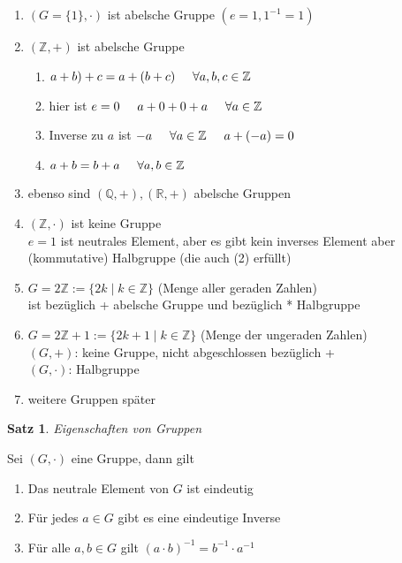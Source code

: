 \documentclass[a4paper,11pt]{article}
\newtheorem{satz}[definition]{Satz}
\begin{document}
\begin{enumerate}[label=\alph*)]
\item $(G=\{1\},\cdot)$ ist abelsche Gruppe $(e=1, 1^{-1}=1)$
\item $(\mathbb{Z}, +)$ ist abelsche Gruppe
\begin{enumerate}[label=(\arabic*)]
\item $a+b)+c=a+(b+c)\hspace{5mm}\forall a,b,c\in\mathbb{Z}$
\item hier ist $e=0\hspace{5mm}a+0+0+a\hspace{5mm}\forall a\in\mathbb{Z}$
\item Inverse zu $a$ ist $-a\hspace{5mm}\forall a\in\mathbb{Z}\hspace{5mm}a+(-a)=0$
\item $a+b=b+a\hspace{5mm}\forall a,b\in\mathbb{Z}$
\end{enumerate}
\item ebenso sind $(\mathbb{Q},+), (\mathbb{R}, +)$ abelsche Gruppen
\item $(\mathbb{Z},\cdot)$ ist keine Gruppe \\
$e=1$ ist neutrales Element, aber es gibt kein inverses Element aber (kommutative) Halbgruppe (die auch (2) erfüllt)
\item $G=2\mathbb{Z}:=\{2k\mid k\in\mathbb{Z}\}$ (Menge aller geraden Zahlen) \\
ist bezüglich + abelsche Gruppe und bezüglich * Halbgruppe
\item $G=2\mathbb{Z}+1:=\{2k+1\mid k\in\mathbb{Z}\}$ (Menge der ungeraden Zahlen) \\
$(G,+)$: keine Gruppe, nicht abgeschlossen bezüglich + \\
$(G,\cdot)$: Halbgruppe
\item weitere Gruppen später
\end{enumerate}
\begin{satz}
Eigenschaften von Gruppen
\end{satz}
Sei $(G,\cdot)$ eine Gruppe, dann gilt
\begin{enumerate}[label=\alph*)]
\item Das neutrale Element von $G$ ist eindeutig 
\item Für jedes $a\in G$ gibt es eine eindeutige Inverse
\item Für alle $a,b\in G$ gilt $(a\cdot b)^{-1}=b^{-1}\cdot a^{-1}$
\end{enumerate}
\end{document}
